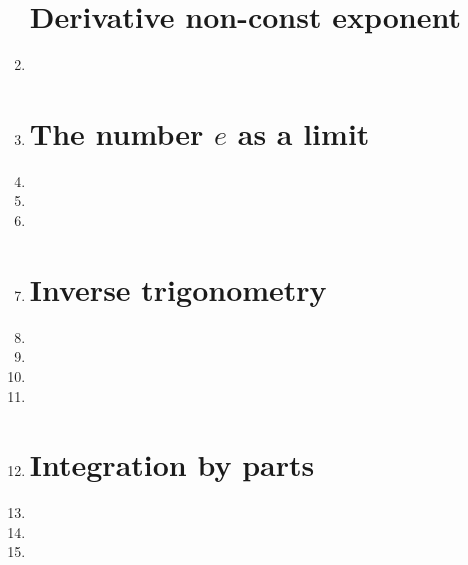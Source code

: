 \documentclass{article}
\begin{document}
\begin{enumerate}
\section{Derivative non-const exponent }
\item 
\item 
\section{The number $e$ as a limit}
\item 
\item 
\item 
\item 
\section{Inverse trigonometry}
\item 

\item 
\item 

\item 
\item 

\section{Integration by parts}
\item 

\item 

\item 

\end{enumerate}
\end{document}
